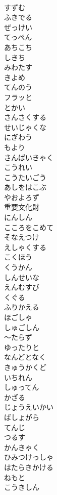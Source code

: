 \documentclass[8pt]{extreport}
\begin{document}
\begin{CJK}{UTF8}{min}
\\	すずむ
\\	ふきでる
\\	ぜっけい
\\	てっぺん
\\	あちこち
\\	しきち
\\	みわたす
\\	きよめ
\\	てんのう
\\	フラッと
\\	とかい
\\	さんさくする
\\	せいじゃくな
\\	にぎわう
\\	もより
\\	さんぱいきゃく
\\	こうれい
\\	こうたいごう
\\	あしをはこぶ
\\	やおよろず
\\	重要文化財
\\	にんしん
\\	こころをこめて
\\	そなえつけ
\\	えしゃくする
\\	こくほう
\\	くうかん
\\	しんせいな
\\	えんむすび
\\	くぐる
\\	ふりかえる
\\	ほごしゃ
\\	しゅごしん
\\	～たらず
\\	ゆったりと
\\	なんどとなく
\\	きゅうかくど
\\	いちれん
\\	しゅってん
\\	かざる
\\	じょうえいかい
\\	ばしょがら
\\	てんじ
\\	つるす
\\	かんきゃく
\\	ひみつけっしゃ
\\	はたらきかける
\\	ねもと
\\	こうきしん

\end{CJK}
\end{document}
